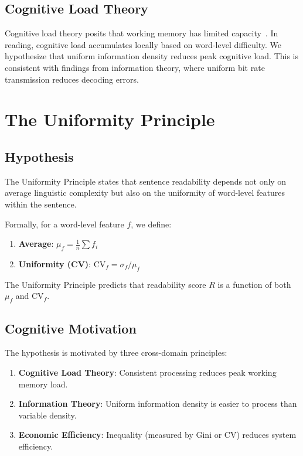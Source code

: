 \documentclass[11pt,letterpaper]{article}
\begin{document}
\subsection{Cognitive Load Theory}

Cognitive load theory posits that working memory has limited capacity~\cite{Sweller1988}. In reading, cognitive load accumulates locally based on word-level difficulty. We hypothesize that uniform information density reduces peak cognitive load. This is consistent with findings from information theory, where uniform bit rate transmission reduces decoding errors.

\section{The Uniformity Principle}

\subsection{Hypothesis}

The Uniformity Principle states that sentence readability depends not only on average linguistic complexity but also on the uniformity of word-level features within the sentence.

Formally, for a word-level feature $f$, we define:
\begin{enumerate}
  \item \textbf{Average}: $\mu_f = \frac{1}{n} \sum f_i$
  \item \textbf{Uniformity (CV)}: $\mathrm{CV}_f = \sigma_f / \mu_f$
\end{enumerate}

The Uniformity Principle predicts that readability score $R$ is a function of both $\mu_f$ and $\mathrm{CV}_f$.

\subsection{Cognitive Motivation}

The hypothesis is motivated by three cross-domain principles:
\begin{enumerate}
  \item \textbf{Cognitive Load Theory}: Consistent processing reduces peak working memory load.
  \item \textbf{Information Theory}: Uniform information density is easier to process than variable density.
  \item \textbf{Economic Efficiency}: Inequality (measured by Gini or CV) reduces system efficiency.
\end{enumerate}
\end{document}

